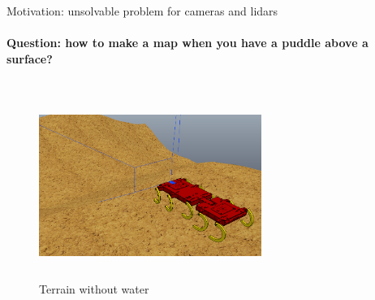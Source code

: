 \documentclass[aspectratio=169,xcolor=table]{beamer}
\begin{document}
\begin{frame}[t]{Motivation: unsolvable problem for cameras and lidars}
    \framesubtitle{Question: how to make a map when you have a puddle above a surface?}
    \vspace{-1cm}
    \begin{columns}[T,onlytextwidth]
        \begin{column}{0.55\textwidth}


            \begin{figure}[H]
                \centering\includegraphics[height=6cm,width=1\textwidth,keepaspectratio]{terrain_wo_water.png}
                \caption*{Terrain without water}
            \end{figure}
        \end{column}
        \begin{column}{0.44\textwidth}
            \begin{figure}[H]
                \begin{subfigure}[b]{0.9\textwidth}
                    \centering
\end{subfigure}
\end{figure}
\end{column}
\end{columns}
\end{frame}
\end{document}
